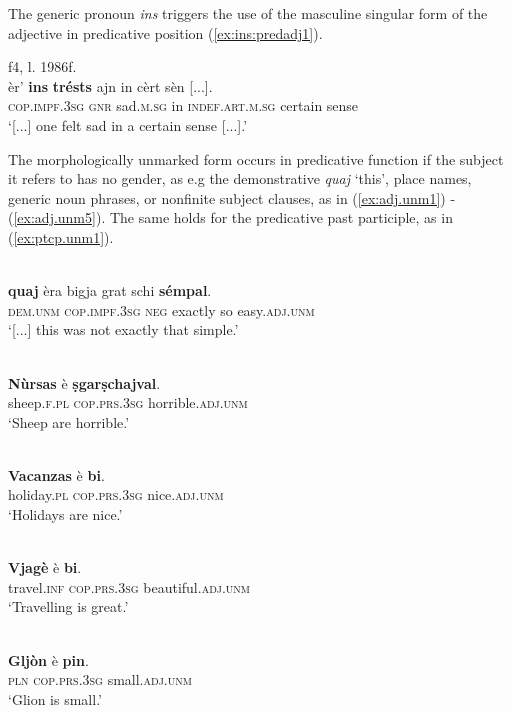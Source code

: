  The generic pronoun \textit{ins} triggers the use of the masculine singular form of the adjective in predicative position (\ref{ex:ins:predadj1}).
 
 \ea
 \label{ex:ins:predadj1}
  {f4, l. 1986f.}\\
 \gll  [...] èr’ \textbf{ins} \textbf{trésts} ajn in cèrt sèn [...].\\
 {} \textsc{cop.impf.3sg} \textsc{gnr} sad.\textsc{m.sg} in \textsc{indef.art.m.sg} certain sense\\
 \glt `[...] one felt sad in a certain sense [...].'
 \z
 
 The morphologically unmarked form occurs in predicative function if the subject it refers to has no gender, as e.g the demonstrative \textit{quaj} `this', place names, generic noun phrases, or nonfinite subject clauses, as in (\ref{ex:adj.unm1}) - (\ref{ex:adj.unm5}). The same holds for the predicative past participle, as in (\ref{ex:ptcp.unm1}).

\ea\label{ex:adj.unm1}
\\
\gll  […] \textbf{quaj} èra bigja grat schi \textbf{sémpal}.  \\
{} \textsc{dem.unm} \textsc{cop.impf.3sg} \textsc{neg} exactly so easy.\textsc{adj.unm}\\
\glt `[...] this was not exactly that simple.'
\z

\ea\label{ex:adj.unm2}
\\
\gll \textbf{Nùrsas} è \textbf{ṣgarṣchajval}.\\
sheep.\textsc{f.pl} \textsc{cop.prs.3sg} horrible.\textsc{adj.unm}\\
\glt `Sheep are horrible.'
\z

\ea\label{ex:adj.unm3}
\\
\gll \textbf{Vacanzas} è \textbf{bi}.\\
holiday.\textsc{pl} \textsc{cop.prs.3sg} nice.\textsc{adj.unm}\\
\glt `Holidays are nice.'
\z

\ea\label{ex:adj.unm4}
\\
\gll  \textbf{Vjagè} è \textbf{bi}.\\
travel.\textsc{inf} \textsc{cop.prs.3sg} beautiful.\textsc{adj.unm}\\
\glt `Travelling is great.'
\z

\ea\label{ex:adj.unm5}
\\
\gll \textbf{Gljòn} è \textbf{pin}.\\
\textsc{pln} \textsc{cop.prs.3sg} small.\textsc{adj.unm}\\
\glt `Glion is small.'
\z


